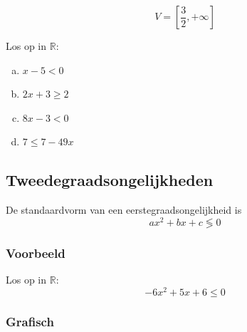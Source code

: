 \documentclass[12pt,twoside,a4paper]{article}
\begin{document}
\[V=[\dfrac{3}{2}, +\infty]\]

\begin{oefening}
Los op in $\mathbb{R}$:
\begin{multicols}{2}
\begin{enumerate}[(a)]
  \itemsep0.6em
  \item $x-5<0$
  \item $2x+3\geq 2$
  \item $8x-3<0$
  \item $7\leq 7-49x$
\end{enumerate}
\end{multicols}
\end{oefening}

\subsection{Tweedegraadsongelijkheden}

De standaardvorm van een eerstegraadsongelijkheid is
\[ax^2 + bx + c \lessgtr 0\]

\subsubsection*{Voorbeeld}

Los  op in $\mathbb{R}$: \[ -6x^2 + 5x + 6 \leq 0 \]

\subsubsection*{Grafisch}
\end{document}
